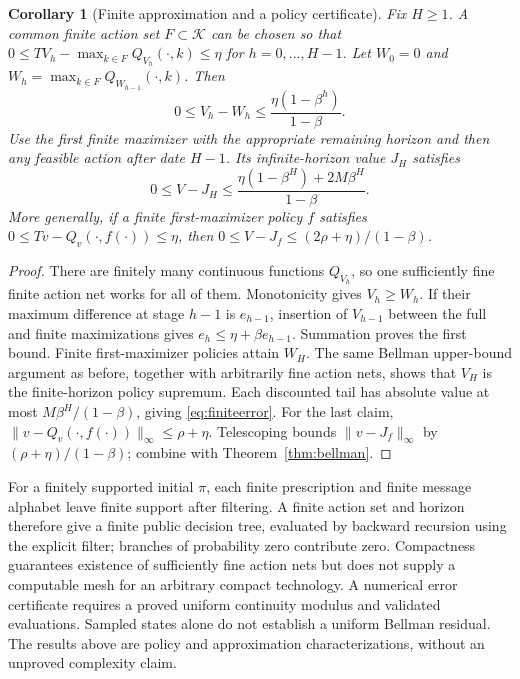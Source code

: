 \documentclass[11pt,a4paper]{article}
\newtheorem{corollary}[theorem]{Corollary}
\newcommand{\cK}{\mathcal K}
\begin{document}
\begin{corollary}[Finite approximation and a policy certificate]\label{cor:approx}
Fix $H\geq1$. A common finite action set $F\subset\cK$ can be chosen so that
$0\leq TV_h-\max_{k\in F}Q_{V_h}(\cdot,k)\leq\eta$ for
$h=0,\ldots,H-1$. Let $W_0=0$ and
$W_h=\max_{k\in F}Q_{W_{h-1}}(\cdot,k)$. Then
\[
 0\leq V_h-W_h\leq\frac{\eta(1-\beta^h)}{1-\beta}.
\]
Use the first finite maximizer with the appropriate remaining horizon and
then any feasible action after date $H-1$. Its infinite-horizon value $J_H$
satisfies
\begin{equation}\label{eq:finiteerror}
 0\leq V-J_H\leq
 \frac{\eta(1-\beta^H)+2M\beta^H}{1-\beta}.
\end{equation}
More generally, if a finite first-maximizer policy $f$ satisfies
$0\leq Tv-Q_v(\cdot,f(\cdot))\leq\eta$, then
$0\leq V-J_f\leq(2\rho+\eta)/(1-\beta)$.
\end{corollary}
\begin{proof}
There are finitely many continuous functions $Q_{V_h}$, so one sufficiently
fine finite action net works for all of them. Monotonicity gives $V_h\geq W_h$.
If their maximum difference at stage $h-1$ is $e_{h-1}$, insertion of
$V_{h-1}$ between the full and finite maximizations gives
$e_h\leq\eta+\beta e_{h-1}$. Summation proves the first bound.
Finite first-maximizer policies attain $W_H$. The same Bellman upper-bound
argument as before, together with arbitrarily fine action nets, shows that
$V_H$ is the finite-horizon policy supremum. Each discounted tail has absolute
value at most $M\beta^H/(1-\beta)$, giving \eqref{eq:finiteerror}.
For the last claim,
$\|v-Q_v(\cdot,f(\cdot))\|_\infty\leq\rho+\eta$.
Telescoping bounds $\|v-J_f\|_\infty$ by
$(\rho+\eta)/(1-\beta)$; combine with Theorem~\ref{thm:bellman}.
\end{proof}

For a finitely supported initial $\pi$, each finite prescription and finite
message alphabet leave finite support after filtering. A finite action set
and horizon therefore give a finite public decision tree, evaluated by backward
recursion using the explicit filter; branches of probability zero contribute
zero. Compactness guarantees existence of sufficiently fine action nets but
does not supply a computable mesh for an arbitrary compact technology. A
numerical error certificate requires a proved uniform continuity modulus and
validated evaluations. Sampled states alone do not establish a uniform Bellman
residual. The results above are policy and approximation characterizations,
without an unproved complexity claim.
\end{document}
